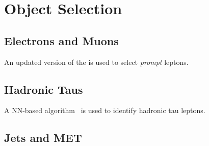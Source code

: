 \chapter{Object Selection}
\label{chap:Obj}


\section{Electrons and Muons}
\label{sec:EandM}

An updated version of the \TOP\cite{CMS:2023ftu} is used to select \emph{prompt} leptons.

\section{Hadronic Taus}
\label{sec:Taus}

A \ac{NN}-based algorithm~\cite{CMS:2022prd} is used to identify hadronic tau leptons.

\section{Jets and MET}
\label{sec:JME}



